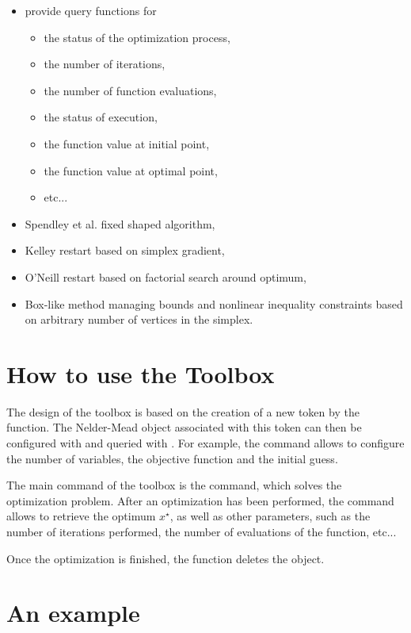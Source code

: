 \begin{itemize}
\item provide query functions for 
  \begin{itemize}
  \item the status of the optimization process,
  \item the number of iterations, 
  \item the number of function evaluations, 
  \item the status of execution, 
  \item the function value at initial point, 
  \item the function value at optimal point, 
  \item etc...
  \end{itemize}
\item Spendley et al. fixed shaped algorithm,
\item Kelley restart based on simplex gradient,
\item O'Neill restart based on factorial search around optimum,
\item Box-like method managing bounds and nonlinear inequality constraints based on arbitrary number of vertices in the simplex.
\end{itemize}

\section{How to use the Toolbox}

The design of the toolbox is based on the creation of 
a new token by the  function.
The Nelder-Mead object associated with this token can then 
be configured with  and queried 
with . For example, the
 command allows to configure the 
number of variables, the objective function and the initial guess.

The main command of the toolbox is the  command, which
solves the optimization problem. After an optimization has been performed,
the  command allows to retrieve the optimum $x^\star$,
as well as other parameters, such as the number of iterations performed, the number 
of evaluations of the function, etc...

Once the optimization is finished, the  function 
deletes the object.

\section{An example}

